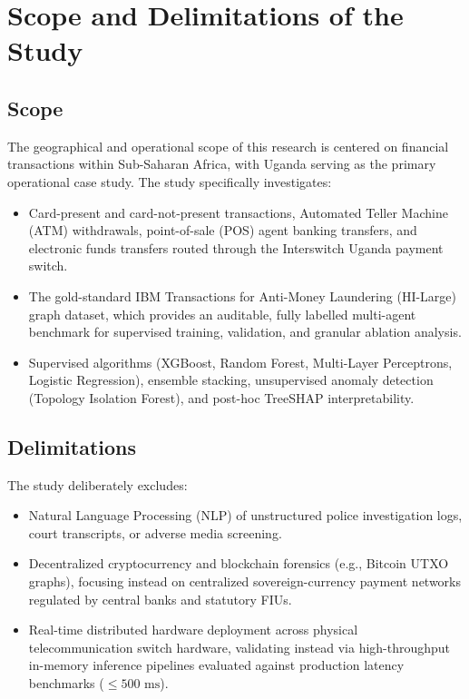 \section{Scope and Delimitations of the Study}
\subsection{Scope}
The geographical and operational scope of this research is centered on financial transactions within Sub-Saharan Africa, with Uganda serving as the primary operational case study. The study specifically investigates:
\begin{itemize}
    \item Card-present and card-not-present transactions, Automated Teller Machine (ATM) withdrawals, point-of-sale (POS) agent banking transfers, and electronic funds transfers routed through the Interswitch Uganda payment switch.
    \item The gold-standard IBM Transactions for Anti-Money Laundering (HI-Large) graph dataset, which provides an auditable, fully labelled multi-agent benchmark for supervised training, validation, and granular ablation analysis.
    \item Supervised algorithms (XGBoost, Random Forest, Multi-Layer Perceptrons, Logistic Regression), ensemble stacking, unsupervised anomaly detection (Topology Isolation Forest), and post-hoc TreeSHAP interpretability.
\end{itemize}

\subsection{Delimitations}
The study deliberately excludes:
\begin{itemize}
    \item Natural Language Processing (NLP) of unstructured police investigation logs, court transcripts, or adverse media screening.
    \item Decentralized cryptocurrency and blockchain forensics (e.g., Bitcoin UTXO graphs), focusing instead on centralized sovereign-currency payment networks regulated by central banks and statutory FIUs.
    \item Real-time distributed hardware deployment across physical telecommunication switch hardware, validating instead via high-throughput in-memory inference pipelines evaluated against production latency benchmarks ($\le 500\text{ ms}$).
\end{itemize}

